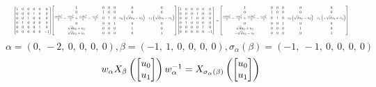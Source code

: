 \documentclass[11pt]{article}
\theoremstyle{definition}
\begin{document}
\[
\scaletoalign{\textwidth}{{\left[\begin{matrix}1 & 0 & 0 & 0 & 0 & 0\\0 & 0 & 0 & 1 & 0 & 0\\0 & 0 & 1 & 0 & 0 & 0\\0 & 1 & 0 & 0 & 0 & 0\\0 & 0 & 0 & 0 & 1 & 0\\0 & 0 & 0 & 0 & 0 & -1\end{matrix}\right]} {\left[\begin{matrix}1 & 0 & 0 & 0 & 0 & 0\\0 & 1 & 0 & 0 & 0 & 0\\\frac{c_{0} d u_{0}^{2}}{2} - \frac{c_{0} u_{2}^{2}}{2} + \frac{c_{1} d u_{3}^{2}}{2} - \frac{c_{1} u_{1}^{2}}{2} & 0 & 1 & 0 & c_{0} \left(\sqrt{d} u_{0} - u_{2}\right) & c_{1} \left(\sqrt{d} u_{3} - u_{1}\right)\\0 & 0 & 0 & 1 & 0 & 0\\\sqrt{d} u_{0} + u_{2} & 0 & 0 & 0 & 1 & 0\\\sqrt{d} u_{3} + u_{1} & 0 & 0 & 0 & 0 & 1\end{matrix}\right]} {\left[\begin{matrix}1 & 0 & 0 & 0 & 0 & 0\\0 & 0 & 0 & 1 & 0 & 0\\0 & 0 & 1 & 0 & 0 & 0\\0 & 1 & 0 & 0 & 0 & 0\\0 & 0 & 0 & 0 & 1 & 0\\0 & 0 & 0 & 0 & 0 & -1\end{matrix}\right]} = {\left[\begin{matrix}1 & 0 & 0 & 0 & 0 & 0\\0 & 1 & 0 & 0 & 0 & 0\\\frac{c_{0} d u_{0}^{2}}{2} - \frac{c_{0} u_{2}^{2}}{2} + \frac{c_{1} d u_{3}^{2}}{2} - \frac{c_{1} u_{1}^{2}}{2} & 0 & 1 & 0 & c_{0} \left(\sqrt{d} u_{0} - u_{2}\right) & c_{1} \left(- \sqrt{d} u_{3} + u_{1}\right)\\0 & 0 & 0 & 1 & 0 & 0\\\sqrt{d} u_{0} + u_{2} & 0 & 0 & 0 & 1 & 0\\- \sqrt{d} u_{3} - u_{1} & 0 & 0 & 0 & 0 & 1\end{matrix}\right]}}
\]
\[
\alpha = \left( 0, \  -2, \  0, \  0, \  0, \  0\right), \beta = \left( -1, \  1, \  0, \  0, \  0, \  0\right), \sigma_{\alpha}(\beta) = \left( -1, \  -1, \  0, \  0, \  0, \  0\right)
\]
\[
\scaletoalign{\textwidth}{w_{\alpha} X_{\beta}\left(\left[\begin{matrix}u_{0}\\u_{1}\end{matrix}\right]\right) w_{\alpha}^{-1} = X_{\sigma_{\alpha}\left(\beta\right)}\left(\left[\begin{matrix}u_{0}\\u_{1}\end{matrix}\right]\right)}
\]
\end{document}

